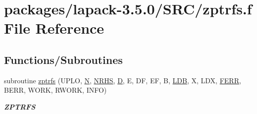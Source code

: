 \hypertarget{zptrfs_8f}{}\section{packages/lapack-\/3.5.0/\+S\+R\+C/zptrfs.f File Reference}
\label{zptrfs_8f}
\subsection*{Functions/\+Subroutines}
\begin{DoxyCompactItemize}
\item 
subroutine \hyperlink{group__complex16PTcomputational_ga93372dc1bb896550f56db40a44b3f202}{zptrfs} (U\+P\+L\+O, \hyperlink{polmisc_8c_a0240ac851181b84ac374872dc5434ee4}{N}, \hyperlink{example__user_8c_aa0138da002ce2a90360df2f521eb3198}{N\+R\+H\+S}, \hyperlink{odrpack_8h_a7dae6ea403d00f3687f24a874e67d139}{D}, E, D\+F, E\+F, B, \hyperlink{example__user_8c_a50e90a7104df172b5a89a06c47fcca04}{L\+D\+B}, X, L\+D\+X, \hyperlink{superlu__enum__consts_8h_af00a42ecad444bbda75cde1b64bd7e72a78fd14d7abebae04095cfbe02928f153}{F\+E\+R\+R}, B\+E\+R\+R, W\+O\+R\+K, R\+W\+O\+R\+K, I\+N\+F\+O)
\begin{DoxyCompactList}\small\item\em {\bfseries Z\+P\+T\+R\+F\+S} \end{DoxyCompactList}\end{DoxyCompactItemize}

